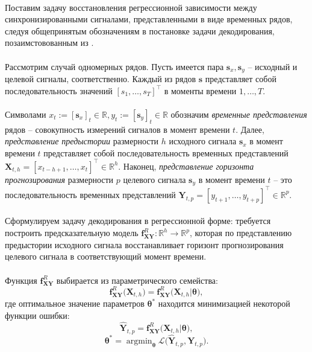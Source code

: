 \documentclass[12pt]{article}
\newcommand\argmin{\mathop{\arg\min}}
\begin{document}
\paragraph{}
Поставим задачу восстановления регрессионной зависимости между синхронизированными сигналами, представленными в виде временных рядов, следуя общепринятым обозначениям в постановке задачи декодирования, позаимстовованным из \cite{Is2018}.
\paragraph{}
Рассмотрим случай одномерных рядов. Пусть имеется пара $\textbf{s}_x, \textbf{s}_y$ -- исходный и целевой сигналы, соответственно. Каждый из рядов $\textbf{s}$ представляет собой последовательность значений $[s_1, \dots, s_T]^\intercal$ в моменты времени $1, \dots, T$.
\paragraph{}
Символами $x_t := [\textbf{s}_x]_t \in \mathds{R}, y_t := [\textbf{s}_y]_t \in \mathds{R}$ обозначим \textit{временные представления} рядов  -- совокупность измерений сигналов в момент времени $t$. Далее, \textit{представление предыстории} размерности $h$ исходного сигнала $\textbf{s}_x$ в момент времени $t$ представляет собой последовательность временных представлений $\textbf{X}_{t,h} = [x_{t-h+1}, \dots, x_t]^\intercal \in \mathds{R}^h$. Наконец, \textit{представление горизонта прогнозирования} размерности $p$ целевого сигнала $\textbf{s}_y$ в момент времени $t$ -- это последовательность временных представлений $\textbf{Y}_{t,p} = [y_{t+1}, \dots, y_{t+p}]^\intercal \in \mathds{R}^p$.
\paragraph{}
Сформулируем задачу декодирования в регрессионной форме: требуется построить предсказательную модель $\textbf{f}^R_{\textbf{XY}}: \mathds{R}^h \rightarrow \mathds{R}^p$, которая по представлению предыстории исходного сигнала восстанавливает горизонт прогнозирования целевого сигнала в соответствующий момент времени.
\paragraph{}
Функция $\textbf{f}^R_{\textbf{XY}}$ выбирается из параметрического семейства: $$\textbf{f}^R_{\textbf{XY}}\Big(\textbf{X}_{t,h}  \Big) = \textbf{f}^R_{\textbf{XY}}\Big( \textbf{X}_{t,h}  |   \boldsymbol{\theta} \Big),$$ 
где оптимальное значение параметров $\boldsymbol{\theta}^*$ находится минимизацией некоторой функции ошибки:
$$ \hat{\textbf{Y}}_{t,p} =  \textbf{f}^R_{\textbf{XY}}\Big( \textbf{X}_{t,h}  |   \boldsymbol{\theta} \Big),$$
$$ \boldsymbol{\theta}^* = \argmin_{\boldsymbol{\theta}}\mathcal{L}\Big(\hat{\textbf{Y}}_{t,p}, \textbf{Y}_{t,p}  \Big).$$
\end{document}
